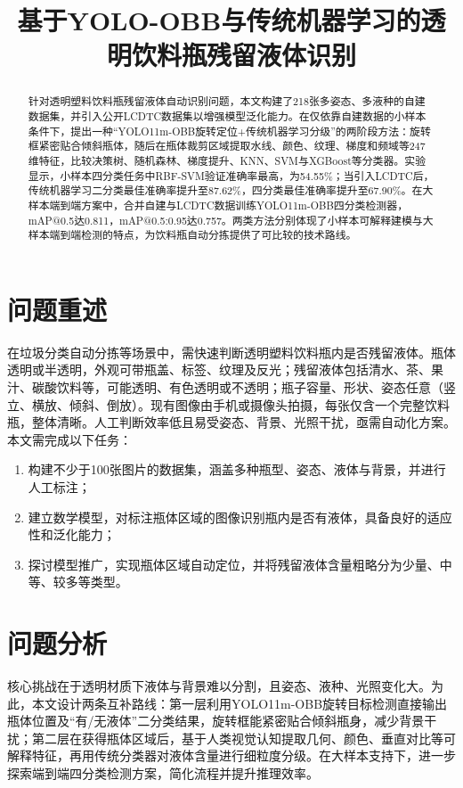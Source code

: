 \documentclass[withoutpreface,bwprint]{cumcmthesis}
\title{基于YOLO-OBB与传统机器学习的透明饮料瓶残留液体识别}
\begin{document}
\maketitle

\begin{abstract}
针对透明塑料饮料瓶残留液体自动识别问题，本文构建了218张多姿态、多液种的自建数据集，并引入公开LCDTC数据集以增强模型泛化能力。在仅依靠自建数据的小样本条件下，提出一种“YOLO11m-OBB旋转定位+传统机器学习分级”的两阶段方法：旋转框紧密贴合倾斜瓶体，随后在瓶体裁剪区域提取水线、颜色、纹理、梯度和频域等247维特征，比较决策树、随机森林、梯度提升、KNN、SVM与XGBoost等分类器。实验显示，小样本四分类任务中RBF-SVM验证准确率最高，为54.55\%；当引入LCDTC后，传统机器学习二分类最佳准确率提升至87.62\%，四分类最佳准确率提升至67.90\%。在大样本端到端方案中，合并自建与LCDTC数据训练YOLO11m-OBB四分类检测器，mAP@0.5达0.811，mAP@0.5:0.95达0.757。两类方法分别体现了小样本可解释建模与大样本端到端检测的特点，为饮料瓶自动分拣提供了可比较的技术路线。

\end{abstract}

\section{问题重述}
在垃圾分类自动分拣等场景中，需快速判断透明塑料饮料瓶内是否残留液体。瓶体透明或半透明，外观可带瓶盖、标签、纹理及反光；残留液体包括清水、茶、果汁、碳酸饮料等，可能透明、有色透明或不透明；瓶子容量、形状、姿态任意（竖立、横放、倾斜、倒放）。现有图像由手机或摄像头拍摄，每张仅含一个完整饮料瓶，整体清晰。人工判断效率低且易受姿态、背景、光照干扰，亟需自动化方案。本文需完成以下任务：
\begin{enumerate}[label=(\arabic*)]
    \item 构建不少于100张图片的数据集，涵盖多种瓶型、姿态、液体与背景，并进行人工标注；
    \item 建立数学模型，对标注瓶体区域的图像识别瓶内是否有液体，具备良好的适应性和泛化能力；
    \item 探讨模型推广，实现瓶体区域自动定位，并将残留液体含量粗略分为少量、中等、较多等类型。
\end{enumerate}

\section{问题分析}
核心挑战在于透明材质下液体与背景难以分割，且姿态、液种、光照变化大。为此，本文设计两条互补路线：第一层利用YOLO11m-OBB旋转目标检测直接输出瓶体位置及“有/无液体”二分类结果，旋转框能紧密贴合倾斜瓶身，减少背景干扰；第二层在获得瓶体区域后，基于人类视觉认知提取几何、颜色、垂直对比等可解释特征，再用传统分类器对液体含量进行细粒度分级。在大样本支持下，进一步探索端到端四分类检测方案，简化流程并提升推理效率。
\end{document}
